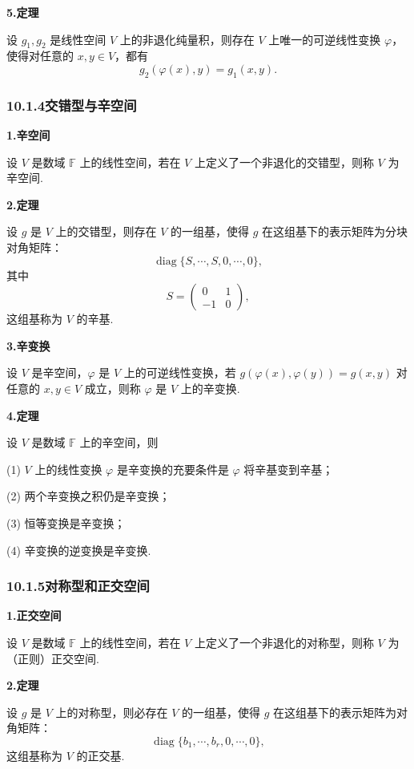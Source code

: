 \documentclass[UTF8, 12pt, fontset=fandol, oneside]{ctexart}
\begin{document}
\noindent\textbf{5.\quad 定理}

设 $g_1,g_2$ 是线性空间 $V$ 上的非退化纯量积，则存在 $V$ 上唯一的可逆线性变换 $\varphi$，使得对任意的 $x,y\in V$，都有
\[
g_2(\varphi(x),y)=g_1(x,y).
\]

\subsubsection*{10.1.4\quad 交错型与辛空间}

\noindent\textbf{1.\quad 辛空间}

设 $V$ 是数域 $\mathbb{F}$ 上的线性空间，若在 $V$ 上定义了一个非退化的交错型，则称 $V$ 为辛空间.

\noindent\textbf{2.\quad 定理}

设 $g$ 是 $V$ 上的交错型，则存在 $V$ 的一组基，使得 $g$ 在这组基下的表示矩阵为分块对角矩阵：
\[
\operatorname{diag}\{S,\cdots,S,0,\cdots,0\},
\]
其中
\[
S=\left(\begin{array}{cc}
0 & 1\\
-1 & 0
\end{array}\right),
\]
这组基称为 $V$ 的辛基.

\noindent\textbf{3.\quad 辛变换}

设 $V$ 是辛空间，$\varphi$ 是 $V$ 上的可逆线性变换，若 $g(\varphi(x),\varphi(y))=g(x,y)$ 对任意的 $x,y\in V$ 成立，则称 $\varphi$ 是 $V$ 上的辛变换.

\noindent\textbf{4.\quad 定理}

设 $V$ 是数域 $\mathbb{F}$ 上的辛空间，则

(1) $V$ 上的线性变换 $\varphi$ 是辛变换的充要条件是 $\varphi$ 将辛基变到辛基；

(2) 两个辛变换之积仍是辛变换；

(3) 恒等变换是辛变换；

(4) 辛变换的逆变换是辛变换.

\subsubsection*{10.1.5\quad 对称型和正交空间}

\noindent\textbf{1.\quad 正交空间}

设 $V$ 是数域 $\mathbb{F}$ 上的线性空间，若在 $V$ 上定义了一个非退化的对称型，则称 $V$ 为（正则）正交空间.

\noindent\textbf{2.\quad 定理}

设 $g$ 是 $V$ 上的对称型，则必存在 $V$ 的一组基，使得 $g$ 在这组基下的表示矩阵为对角矩阵：
\[
\operatorname{diag}\{b_1,\cdots,b_r,0,\cdots,0\},
\]
这组基称为 $V$ 的正交基.
\end{document}
